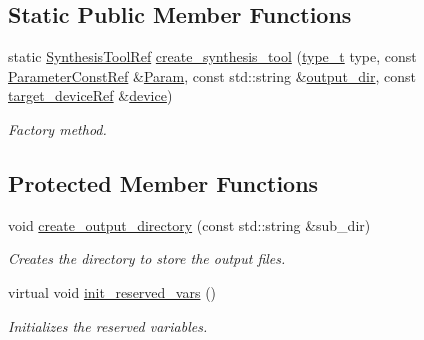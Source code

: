 \subsection*{Static Public Member Functions}
\begin{DoxyCompactItemize}
\item 
static \hyperlink{SynthesisTool_8hpp_af82cb8fc071612a27507a7c212097e58}{Synthesis\+Tool\+Ref} \hyperlink{classSynthesisTool_ae066f0740c41bad1b3666abb0672b187}{create\+\_\+synthesis\+\_\+tool} (\hyperlink{classSynthesisTool_a8a3b714a93c1e17e715253b5ea2e2647}{type\+\_\+t} type, const \hyperlink{Parameter_8hpp_a37841774a6fcb479b597fdf8955eb4ea}{Parameter\+Const\+Ref} \&\hyperlink{classSynthesisTool_a854ef102782ff4d069e1aa6d1a94d64e}{Param}, const std\+::string \&\hyperlink{classSynthesisTool_a285793f6f539ed6f049c375cdb68d607}{output\+\_\+dir}, const \hyperlink{target__device_8hpp_acedb2b7a617e27e6354a8049fee44eda}{target\+\_\+device\+Ref} \&\hyperlink{classSynthesisTool_a07bf37421c6cff80ba70682ea2b2e3ae}{device})
\begin{DoxyCompactList}\small\item\em Factory method. \end{DoxyCompactList}\end{DoxyCompactItemize}
\subsection*{Protected Member Functions}
\begin{DoxyCompactItemize}
\item 
void \hyperlink{classSynthesisTool_a759edbe8e0ce7d35f563196c4944ae9d}{create\+\_\+output\+\_\+directory} (const std\+::string \&sub\+\_\+dir)
\begin{DoxyCompactList}\small\item\em Creates the directory to store the output files. \end{DoxyCompactList}\item 
virtual void \hyperlink{classSynthesisTool_a85b4a4fa0cc60e5325a79d7479c505b7}{init\+\_\+reserved\+\_\+vars} ()
\begin{DoxyCompactList}\small\item\em Initializes the reserved variables. \end{DoxyCompactList}\end{DoxyCompactItemize}
